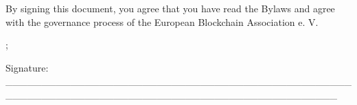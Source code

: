 \documentclass{article}
\begin{document}
\vspace{2cm}

By signing this document, you agree that you have read the Bylaws and agree with the governance process of the European Blockchain Association e. V.

\vspace{5cm}

; 

\vspace{2cm}

Signature: \_\_\_\_\_\_\_\_\_\_\_\_\_\_\_\_\_\_\_\_\_\_\_\_\_\_\_\_\_\_\_\_\_\_\_\_\_\_\_\_\_\_\_\_\_\_\_\_\_\_\_\_\_\_\_\_\_\_\_\_\_\_\_\_\_\_\_\_\_\_\_\_\_\_\_\_\_\_\_\_\_\_\_\_\_\_\_\_\_\_\_\_\_\_\	
\end{document}
